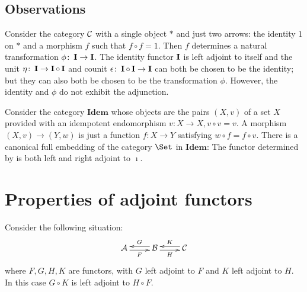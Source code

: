 \subsection{Observations}
  \begin{ex}
    Consider the category ${\cal C}$ with a single object $\ast$ and just two arrows: the identity $1$ on $\ast$ and a morphism $f$ such that $f \circ f = 1$. Then $f$ determines a natural transformation $\phi\colon\operatorname{\mathbf{I}}\to\operatorname{\mathbf{I}}$. The identity functor $\operatorname{\mathbf{I}}$ is left adjoint to itself and the unit $\eta\colon\operatorname{\mathbf{I}}\to\operatorname{\mathbf{I}}\circ\operatorname{\mathbf{I}}$ and counit $\epsilon\colon\operatorname{\mathbf{I}}\circ\operatorname{\mathbf{I}}\to\operatorname{\mathbf{I}}$ can both be chosen to be the identity; but they can also both be chosen to be the transformation $\phi$. However, the identity and $\phi$ do not exhibit the adjunction.
  \end{ex}
  \begin{ex}
    Consider the category $\mathbf{Idem}$ whose objects are the pairs $(X,v)$ of a set $X$ provided with an idempotent endomorphism $v\colon X\to X, v\circ v=v$. A morphism $(X, v) \to (Y, w)$ is just a function $f\colon X \to Y$ satisfying $w\circ f = f\circ v$.
    There is a canonical full embedding of the category $\Set$ in $\mathbf{Idem}$:
    The functor determined by
    is both left and right adjoint to $\imath$.
  \end{ex}


\newpage\section{Properties of adjoint functors}
  \begin{prop}
    Consider the following situation:
      \begin{displaymath}
        \xymatrix{
          \Aa\ar@<-0.5ex>[r]_{F}&\Bb\ar@<-0.5ex>[l]_{G}\ar@<-0.5ex>[r]_{H}&\Cc\ar@<-0.5ex>[l]_{K}
         }
      \end{displaymath}
  where $F,G,H,K$ are functors, with $G$ left adjoint to $F$ and $K$ left adjoint to $H$. In this case $G\circ K$ is left adjoint to $H\circ F$.
  \end{prop}

